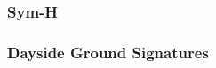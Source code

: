 \documentclass{beamer}
\newcommand{\backupend}{
   \setcounter{framenumber}{\value{finalframe}}
}
\begin{document}

\begin{frame}
\frametitle{Sym-H}

\end{frame}


\begin{frame}
\frametitle{Dayside Ground Signatures}

\end{frame}


\backupend
\end{document}
